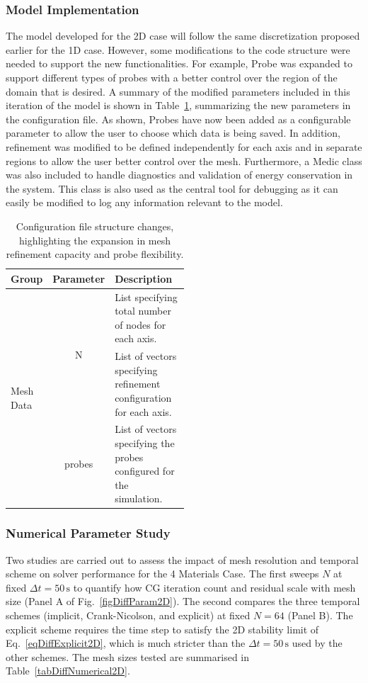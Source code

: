 \subsubsection{Model Implementation}
The model developed for the 2D case will follow the same discretization proposed earlier for the 1D case. However, some modifications to the code structure were needed to support the new functionalities. For example, Probe was expanded to support different types of probes with a better control over the region of the domain that is desired. A summary of the modified parameters included in this iteration of the model is shown in Table~\ref{tabConfig2D}, summarizing the new parameters in the configuration file. As shown, Probes have now been added as a configurable parameter to allow the user to choose which data is being saved. In addition, refinement was modified to be defined independently for each axis and in separate regions to allow the user better control over the mesh. Furthermore, a Medic class was also included to handle diagnostics and validation of energy conservation in the system. This class is also used as the central tool for debugging as it can easily be modified to log any information relevant to the model.

\begin{table}[ht]
	\centering
	\begin{tabular}{|l|c|p{0.5\linewidth}|}
		\hline
		Group & Parameter & Description \\
		\hline
        \multirow{4}{*}{Mesh Data} & \multirow{2}{*}{N} & List specifying total number of nodes for each axis. \\
					   & \multirow{2}{*}{refinement} & List of vectors specifying refinement configuration for each axis. \\
		\hline
		\multirow{2}{*}{Probe Data} & \multirow{2}{*}{probes} & List of vectors specifying the probes configured for the simulation. \\
		\hline
	\end{tabular}
	\caption{Configuration file structure changes, highlighting the expansion in mesh refinement capacity and probe flexibility.}
	\label{tabConfig2D}
\end{table}

\subsubsection{Numerical Parameter Study}
Two studies are carried out to assess the impact of mesh resolution and temporal scheme on solver performance for the 4 Materials Case. The first sweeps $N$ at fixed $\Delta t = 50\,\text{s}$ to quantify how CG iteration count and residual scale with mesh size (Panel A of Fig.~\ref{figDiffParam2D}). The second compares the three temporal schemes (implicit, Crank-Nicolson, and explicit) at fixed $N = 64$ (Panel B). The explicit scheme requires the time step to satisfy the 2D stability limit of Eq.~\eqref{eqDiffExplicit2D}, which is much stricter than the $\Delta t = 50\,\text{s}$ used by the other schemes. The mesh sizes tested are summarised in Table~\ref{tabDiffNumerical2D}.

